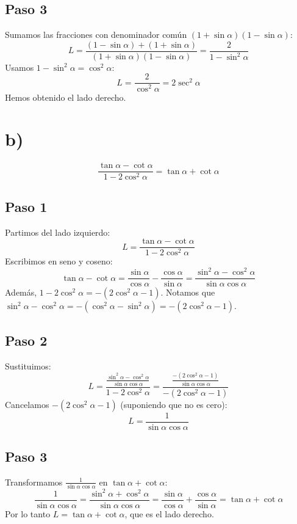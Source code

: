 \documentclass[12pt,a4paper]{article}
\begin{document}
\subsection*{Paso 3}
Sumamos las fracciones con denominador común \((1+\sin\alpha)(1-\sin\alpha)\):
\[
L = \frac{(1-\sin\alpha)+(1+\sin\alpha)}{(1+\sin\alpha)(1-\sin\alpha)}
= \frac{2}{1-\sin^2\alpha}
\]
Usamos \(1-\sin^2\alpha = \cos^2\alpha\):
\[
L = \frac{2}{\cos^2\alpha} = 2\sec^2\alpha
\]
Hemos obtenido el lado derecho.

\newpage
\section*{b)}

\begin{identidad}
\[
\frac{\tan\alpha-\cot\alpha}
{1-2\cos^2\alpha}
=
\tan\alpha+\cot\alpha
\]
\end{identidad}

\subsection*{Paso 1}
Partimos del lado izquierdo:
\[
L = \frac{\tan\alpha-\cot\alpha}{1-2\cos^2\alpha}
\]
Escribimos en seno y coseno:
\[
\tan\alpha-\cot\alpha = \frac{\sin\alpha}{\cos\alpha} - \frac{\cos\alpha}{\sin\alpha}
= \frac{\sin^2\alpha-\cos^2\alpha}{\sin\alpha\cos\alpha}
\]
Además, \(1-2\cos^2\alpha = - (2\cos^2\alpha-1)\). Notamos que \(\sin^2\alpha-\cos^2\alpha = -(\cos^2\alpha-\sin^2\alpha) = -(2\cos^2\alpha-1)\).

\subsection*{Paso 2}
Sustituimos:
\[
L = \frac{ \frac{\sin^2\alpha-\cos^2\alpha}{\sin\alpha\cos\alpha} }{1-2\cos^2\alpha}
= \frac{ \frac{-(2\cos^2\alpha-1)}{\sin\alpha\cos\alpha} }{ -(2\cos^2\alpha-1) }
\]
Cancelamos \(-(2\cos^2\alpha-1)\) (suponiendo que no es cero):
\[
L = \frac{1}{\sin\alpha\cos\alpha}
\]

\subsection*{Paso 3}
Transformamos \(\frac{1}{\sin\alpha\cos\alpha}\) en \(\tan\alpha+\cot\alpha\):
\[
\frac{1}{\sin\alpha\cos\alpha}
= \frac{\sin^2\alpha+\cos^2\alpha}{\sin\alpha\cos\alpha}
= \frac{\sin\alpha}{\cos\alpha} + \frac{\cos\alpha}{\sin\alpha}
= \tan\alpha + \cot\alpha
\]
Por lo tanto \(L = \tan\alpha+\cot\alpha\), que es el lado derecho.
\end{document}
